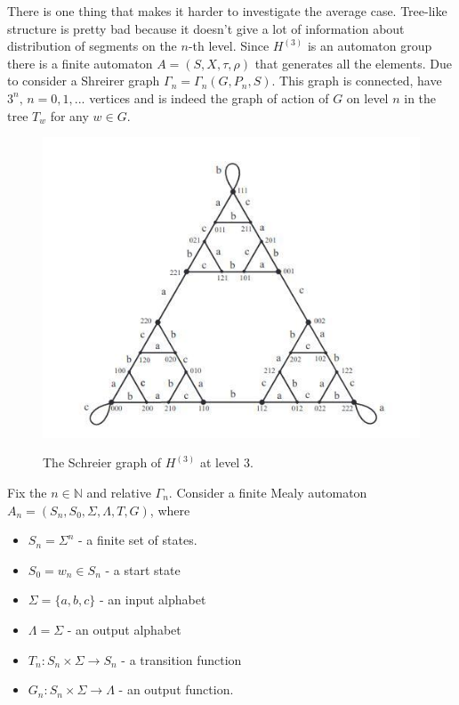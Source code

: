 \documentclass[a4paper,12pt]{amsart}
\begin{document}
There is one thing that makes it harder to investigate the average case. Tree-like structure is pretty bad 
because it doesn't give a lot of information about distribution of segments on the $n$-th level. Since $H^{(3)}$ is an automaton group there is a finite automaton $A = (S, X, \tau, \rho)$ that generates all the elements. Due to \cite{Hanoi1} 
consider a Shreirer graph $\Gamma_n = \Gamma_n(G, P_n, S)$. This graph is connected, have $3^n, \, n = 0, 1, ...$ 
vertices and is indeed the graph of action of $G$ on level $n$ in the tree $T_w$ for any $w \in G$.

\begin{figure}[h]
	\centering
	\includegraphics[scale=0.8]{../graphs/SchraierH3.jpg}
	\label{automaton}
	\caption{The Schreier graph of $H^{(3)}$ at level 3.}	
	
\end{figure}

Fix the $n \in \mathbb{N}$ and relative $\Gamma_n$. Consider a finite Mealy automaton 
$A_n = (S_n, S_0, \Sigma, \Lambda, T, G)$, where 

\begin{itemize}
	\item $S_n = \Sigma^n$ - a finite set of states. 
	\item $S_0 = w_n \in S_n$ - a start state
	\item $\Sigma = \{a, b, c\}$ - an input alphabet
	\item $\Lambda = \Sigma$ - an output alphabet 
	\item $T_n: S_n \times \Sigma \rightarrow S_n$ - a transition function 
	\item $G_n: S_n \times \Sigma \rightarrow \Lambda$ - an output function.
\end{itemize}
\end{document}
